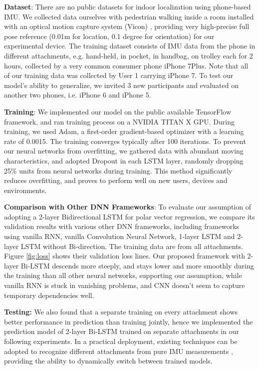\documentclass[letterpaper]{article}
\begin{document}
	\textbf{Dataset}: There are no public datasets for indoor localization using phone-based IMU. We collected data ourselves with pedestrian walking inside a room installed with an optical motion capture system (Vicon) \cite{Vicon2017}, providing very high-precise full pose reference (0.01m for location, 0.1 degree for orientation) for our experimental device. The training dataset consists of IMU data from the phone in different attachments, e.g. hand-held, in pocket, in handbag, on trolley each for 2 hours, collected by a very common consumer phone iPhone 7Plus. Note that all of our training data was collected by User 1 carrying iPhone 7. To test our model's ability to generalize, we invited 3 new participants and evaluated on another two phones, i.e. iPhone 6 and iPhone 5. 
    
    \textbf{Training}: We implemented our model on the public available TensorFlow framework, and ran training process on a NVIDIA TITAN X GPU. During training, we used Adam, a first-order gradient-based optimizer \cite{Kingma2014} with a learning rate of 0.0015. The training converges typically after 100 iterations. To prevent our neural networks from overfitting, we gathered data with abundant moving characteristics, and adopted Dropout \cite{Srivastava2014} in each LSTM layer, randomly dropping 25\% units from neural networks during training. This method significantly reduces overfitting, and proves to perform well on new users, devices and environments. 

	\textbf{Comparison with Other DNN Frameworks}: To evaluate our assumption of adopting a 2-layer Bidirectional LSTM for polar vector regression, we compare its validation results with various other DNN frameworks, including frameworks using vanilla RNN, vanilla Convolution Neural Network, 1-layer LSTM and 2-layer LSTM without Bi-direction. The training data are from all attachments. Figure \ref{fig:loss} shows their validation loss lines. Our proposed framework with 2-layer Bi-LSTM descends more steeply, and stays lower and more smoothly during the training than all other neural networks, supporting our assumption, while vanilla RNN is stuck in vanishing problems, and CNN doesn't seem to capture temporary dependencies well. 
    
    \textbf{Testing:} We also found that a separate training on every attachment shows better performance in prediction than training jointly, hence we implemented the prediction model of 2-layer Bi-LSTM trained on separate attachments in our following experiments. In a practical deployment, existing techniques can be adopted to recognize different attachments from pure IMU measurements \cite{Brajdic2013}, providing the ability to dynamically switch between trained models.
\end{document}
